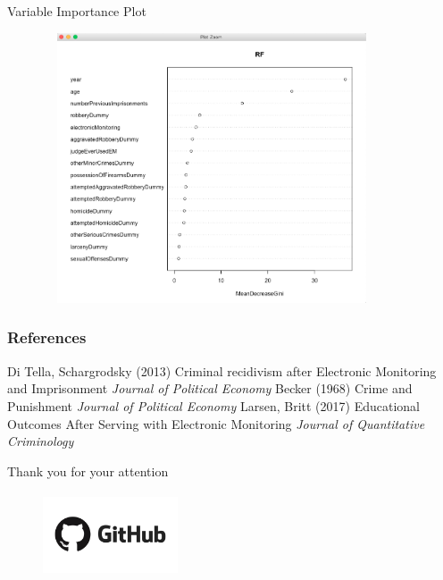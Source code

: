 \documentclass{beamer}
\begin{document}
\begin{frame}{Variable Importance Plot}
      \begin{figure}        
\centering
\includegraphics[width=10cm, height = 8cm]{Feature_imp.JPEG}
\end{figure}
\end{frame}
\begin{frame}
\frametitle{References}
\footnotesize{
\begin{thebibliography}{99} %
 Di Tella, Schargrodsky (2013)
\newblock Criminal recidivism after Electronic Monitoring and Imprisonment
\newblock \emph{Journal of Political Economy}
 Becker (1968)
\newblock Crime and Punishment
\newblock \emph{Journal of Political Economy}
 Larsen, Britt (2017)
\newblock Educational Outcomes After Serving with Electronic Monitoring
\newblock \emph{Journal of Quantitative Criminology}
\end{thebibliography}
}


\end{frame}
\begin{frame}
\Huge{\centerline{Thank you for your attention}}
 \begin{figure}        
\centering
\includegraphics[width=4cm, height = 2.5cm]{github.jpg}
\end{figure}
\end{frame}
\end{document}
